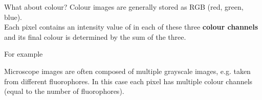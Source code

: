 \documentclass[9pt, aspectratio=169]{beamer}
\begin{document}
\begin{frame}
    {What about colour?}
    Colour images are generally stored as RGB (red, green, blue).\\
    Each pixel contains an intensity value of in each of these three \textbf{colour channels} and its final colour is determined by the sum of the three.

    For example

    \pause
    \vspace{2em}
    Microscope images are often composed of multiple grayscale images, e.g. taken from different fluorophores. In this case each pixel has multiple colour channels (equal to the number of fluorophores).
\end{frame}
\end{document}
